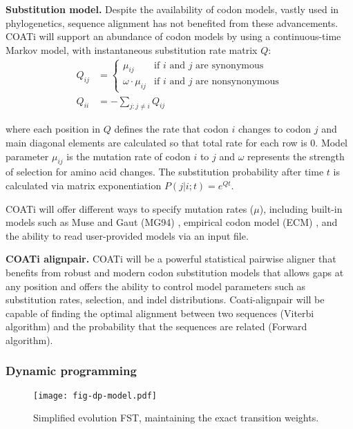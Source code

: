 \textbf{Substitution model.}
Despite the availability of codon models, vastly used in phylogenetics, sequence
alignment has not benefited from these advancements.
COATi will support an abundance of codon models by using a continuous-time
Markov model, with instantaneous substitution rate matrix $Q$:
\begin{align*} Q_{ij} &= \begin{cases}
    \mu_{ij} & \text{if $i$ and $j$ are synonymous}\\
    \omega \cdot \mu_{ij} & \text{if $i$ and $j$ are nonsynonymous}
    \end{cases}\\[10pt]
   Q_{ii} &= -\sum_{j:j \neq i} Q_{ij}
\end{align*}

where each position in $Q$ defines the rate that codon $i$ changes to codon $j$
and main diagonal elements are calculated so that total rate for each row is 0.
Model parameter $\mu_{ij}$ is the mutation rate of codon $i$ to $j$ and $\omega$
represents the strength of selection for amino acid changes.
The substitution probability after time $t$ is calculated via matrix
exponentiation $P(j|i;t) = e^{Qt}$.

COATi will offer different ways to specify mutation rates ($\mu$), including
built-in models such as Muse and Gaut (MG94) \parencite{muse_gaut_1994},
empirical codon model (ECM) \parencite{kosiol_ECM_2007}, and the ability to read
user-provided models via an input file.

\textbf{COATi alignpair.}
COATi will be a powerful statistical pairwise aligner that benefits from
robust and modern codon substitution models that allows gaps at any position and
offers the ability to control model parameters such as substitution rates,
selection, and indel distributions.
Coati-alignpair will be capable of finding the optimal alignment between two
sequences (Viterbi
algorithm) and the probability that the sequences are related (Forward algorithm).

\vspace{1em}

\subsubsection{Dynamic programming}

\begin{wrapfigure}{r}{0.5\textwidth}
    \vspace{-3em}
    \centering
    \texttt{[image: fig-dp-model.pdf]}
    \caption{Simplified evolution FST, maintaining the exact transition weights.}
    \label{fig:dp-model}
\end{wrapfigure}

